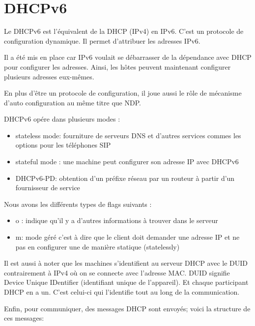\section{DHCPv6}

Le DHCPv6 est l’équivalent de la DHCP (IPv4) en IPv6.
C’est un protocole de configuration dynamique.
Il permet d’attribuer les adresses IPv6. 

Il a été mis en place car IPv6 voulait se débarrasser de la dépendance avec DHCP pour configurer les adresses. 
Ainsi, les hôtes peuvent maintenant configurer plusieurs adresses eux-mêmes. 

En plus d’être un protocole de configuration, il joue aussi le rôle de mécanisme d’auto configuration au même titre que NDP. 

DHCPv6 opére dans plusieurs modes :
\begin{itemize}
  \item stateless mode: fourniture de serveurs DNS et d’autres services commes les options pour les téléphones SIP
  \item stateful mode : une machine peut configurer son adresse IP avec DHCPv6
  \item DHCPv6-PD: obtention d’un préfixe réseau par un routeur à partir d’un fournisseur de service
\end{itemize}


Nous avons les différents types de flags suivants : 
\begin{itemize}
  \item o : indique qu’il y a d’autres informations à trouver dans le serveur 
  \item m: mode géré c’est à dire que le client doit demander une adresse IP et ne pas en configurer une de manière statique (statelessly)
\end{itemize}

Il est aussi à noter que les machines s’identifient au serveur DHCP avec le DUID contrairement à IPv4 où on se connecte avec l’adresse MAC. 
DUID signifie Device Unique IDentifier (identifiant unique de l’appareil). Et chaque participant DHCP en a un. C’est celui-ci qui l’identifie tout au long de la communication.

Enfin, pour communiquer, des messages DHCP sont envoyés; voici  la structure de ces messages: 


